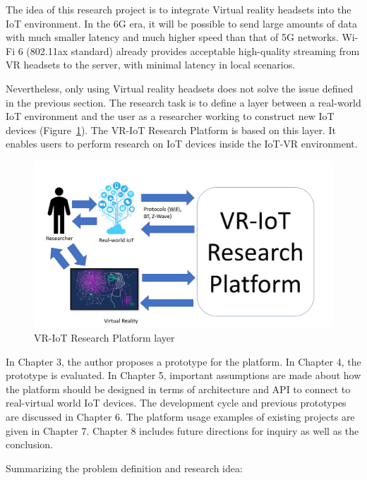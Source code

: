 The idea of this research project is to integrate Virtual reality headsets into the IoT environment. In the 6G era, it will be possible to send large amounts of data with much smaller latency and much higher speed than that of 5G networks. Wi-Fi 6 (802.11ax standard) already provides acceptable high-quality streaming from VR headsets to the server, with minimal latency in local scenarios.

Nevertheless, only using Virtual reality headsets does not solve the issue defined in the previous section. The research task is to define a layer between a real-world IoT environment and the user as a researcher working to construct new IoT devices (Figure~\ref{fig:VR-IoTResearchPlatformLayer-figure}). The VR-IoT Research Platform is based on this layer. It enables users to perform research on IoT devices inside the IoT-VR environment.

\begin{figure}
  \centering
  \includegraphics[width=0.9\linewidth]{figures/VR-IoTResearchPlatformLayer.png}
  \caption{VR-IoT Research Platform layer}
  \label{fig:VR-IoTResearchPlatformLayer-figure}
\end{figure}

In Chapter 3, the author proposes a prototype for the platform. In Chapter 4, the prototype is evaluated. In Chapter 5, important assumptions are made about how the platform should be designed in terms of architecture and API to connect to real-virtual world IoT devices. The development cycle and previous prototypes are discussed in Chapter 6. The platform usage examples of existing projects are given in Chapter 7. Chapter 8 includes future directions for inquiry as well as the conclusion.

Summarizing the problem definition and research idea:

